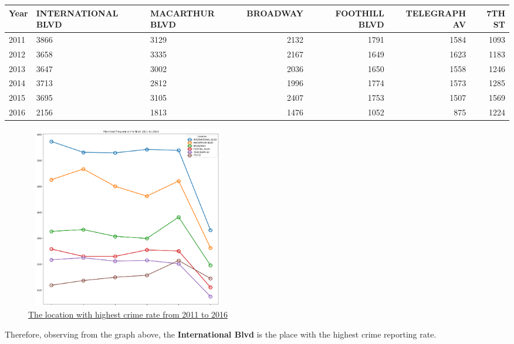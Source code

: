 \documentclass{article} %
\begin{document}
\begin{center}
\begin{tabular}{|l|p{3cm}|p{2.2cm}|r|r|r|r|}
	\toprule
	Year & INTERNATIONAL BLVD &  MACARTHUR BLVD &  BROADWAY &  FOOTHILL BLVD &  TELEGRAPH AV &  7TH ST \\
	\midrule
	2011 &                3866 &            3129 &      2132 &           1791 &          1584 &    1093 \\
	2012 &                3658 &            3335 &      2167 &           1649 &          1623 &    1183 \\
	2013 &                3647 &            3002 &      2036 &           1650 &          1558 &    1246 \\
	2014 &                3713 &            2812 &      1996 &           1774 &          1573 &    1285 \\
	2015 &                3695 &            3105 &      2407 &           1753 &          1507 &    1569 \\
	2016 &                2156 &            1813 &      1476 &           1052 &           875 &    1224 \\
	\bottomrule
\end{tabular}
\end{center}

\begin{figure}[H]
	\begin{center}
		\includegraphics[height=8cm, width=9cm]{3.png}
	\end{center}
	\caption{\hyperref[appendix:plot2]{The location with highest crime rate from 2011 to 2016}}
\end{figure}

Therefore, observing from the graph above, the \textbf{International Blvd} is the place with the highest crime reporting rate.
\end{document}
